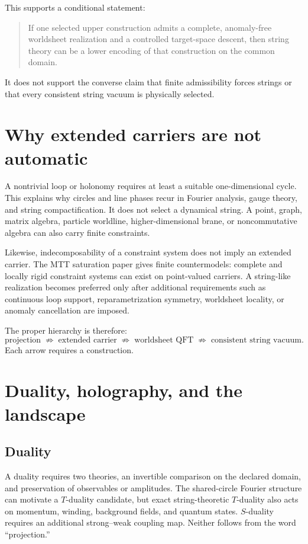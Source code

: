 \documentclass[11pt]{article}
\begin{document}
This supports a conditional statement:
\begin{quote}
If one selected upper construction admits a complete, anomaly-free
worldsheet realization and a controlled target-space descent, then string
theory can be a lower encoding of that construction on the common domain.
\end{quote}
It does not support the converse claim that finite admissibility forces
strings or that every consistent string vacuum is physically selected.

\section{Why extended carriers are not automatic}

A nontrivial loop or holonomy requires at least a suitable one-dimensional
cycle. This explains why circles and line phases recur in Fourier analysis,
gauge theory, and string compactification. It does not select a dynamical
string. A point, graph, matrix algebra, particle worldline, higher-dimensional
brane, or noncommutative algebra can also carry finite constraints.

Likewise, indecomposability of a constraint system does not imply an
extended carrier. The MTT saturation paper gives finite countermodels:
complete and locally rigid constraint systems can exist on point-valued
carriers. A string-like realization becomes preferred only after additional
requirements such as continuous loop support, reparametrization symmetry,
worldsheet locality, or anomaly cancellation are imposed.

The proper hierarchy is therefore:
\[
 \text{projection}
 \;\not\Rightarrow\;
 \text{extended carrier}
 \;\not\Rightarrow\;
 \text{worldsheet QFT}
 \;\not\Rightarrow\;
 \text{consistent string vacuum}.
\]
Each arrow requires a construction.

\section{Duality, holography, and the landscape}

\subsection{Duality}

A duality requires two theories, an invertible comparison on the declared
domain, and preservation of observables or amplitudes. The shared-circle
Fourier structure can motivate a \(T\)-duality candidate, but exact
string-theoretic \(T\)-duality also acts on momentum, winding, background
fields, and quantum states. \(S\)-duality requires an additional
strong--weak coupling map. Neither follows from the word ``projection.''
\end{document}
